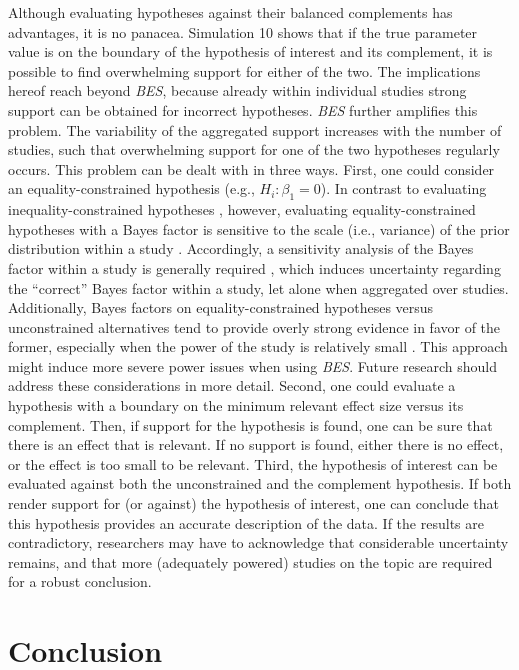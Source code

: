 \documentclass[
  authoryear,
  preprint,
  5p,
  twocolumn]{elsarticle}
\begin{document}
Although evaluating hypotheses against their balanced complements has
advantages, it is no panacea. Simulation 10 shows that if the true
parameter value is on the boundary of the hypothesis of interest and its
complement, it is possible to find overwhelming support for either of
the two. The implications hereof reach beyond \emph{BES}, because
already within individual studies strong support can be obtained for
incorrect hypotheses. \emph{BES} further amplifies this problem. The
variability of the aggregated support increases with the number of
studies, such that overwhelming support for one of the two hypotheses
regularly occurs. This problem can be dealt with in three ways. First,
one could consider an equality-constrained hypothesis (e.g.,
\(H_i: \beta_1=0\)). In contrast to evaluating inequality-constrained
hypotheses \citep{klugkist_bf_2007}, however, evaluating
equality-constrained hypotheses with a Bayes factor is sensitive to the
scale (i.e., variance) of the prior distribution within a study
\citep{hoijtink_prior_2021, tendeiro_kiers_2019}. Accordingly, a
sensitivity analysis of the Bayes factor within a study is generally
required \citep{hoijtink_prior_2021}, which induces uncertainty
regarding the ``correct'' Bayes factor within a study, let alone when
aggregated over studies. Additionally, Bayes factors on
equality-constrained hypotheses versus unconstrained alternatives tend
to provide overly strong evidence in favor of the former, especially
when the power of the study is relatively small
\citep[e.g.,][]{tendeiro_kiers_2019}. This approach might induce more
severe power issues when using \emph{BES}. Future research should
address these considerations in more detail. Second, one could evaluate
a hypothesis with a boundary on the minimum relevant effect size versus
its complement. Then, if support for the hypothesis is found, one can be
sure that there is an effect that is relevant. If no support is found,
either there is no effect, or the effect is too small to be relevant.
Third, the hypothesis of interest can be evaluated against both the
unconstrained and the complement hypothesis. If both render support for
(or against) the hypothesis of interest, one can conclude that this
hypothesis provides an accurate description of the data. If the results
are contradictory, researchers may have to acknowledge that considerable
uncertainty remains, and that more (adequately powered) studies on the
topic are required for a robust conclusion.

\hypertarget{conclusion}{%
\section{Conclusion}\label{conclusion}}
\end{document}
